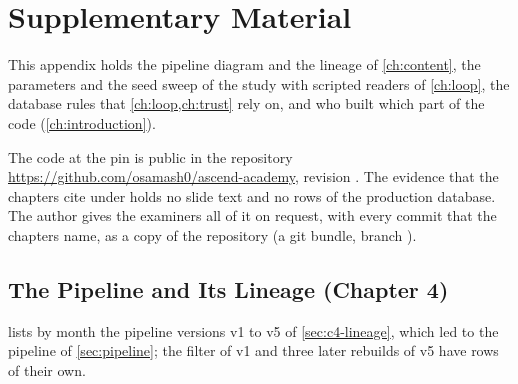 \chapter{Supplementary Material}
\label{app:detail}
\label{app:figures}

This appendix holds the pipeline diagram and the lineage of \cref{ch:content},
the parameters and the seed sweep of the study with scripted readers of
\cref{ch:loop}, the database rules that \cref{ch:loop,ch:trust} rely on, and
who built which part of the code (\cref{ch:introduction}).

The code at the pin is public in the repository
\url{https://github.com/osamash0/ascend-academy}, revision
. The evidence that the
chapters cite under  holds no slide text and
no rows of the production database. The author gives the examiners all of it on
request, with every commit that the chapters name, as a copy of the
repository (a git bundle, branch ).

\section{The Pipeline and Its Lineage (Chapter 4)}
\label{sec:lineage-table}

 lists by month the pipeline versions v1 to v5 of
\cref{sec:c4-lineage}, which led to the pipeline of \cref{sec:pipeline}; the
filter of v1 and three later rebuilds of v5 have rows of their own.

